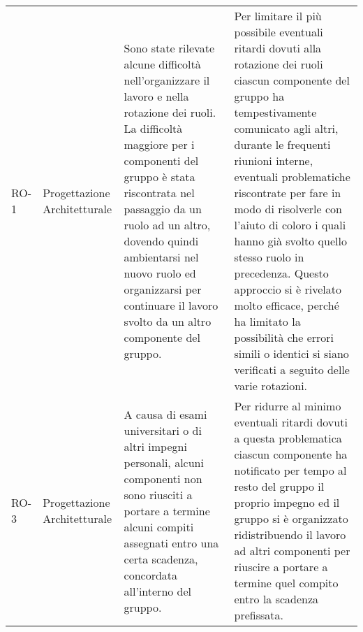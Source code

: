 \begin{longtable}{
		>{\centering}p{}
		>{\centering}p{}
		>{\centering\arraybackslash}p{}
		>{\centering\arraybackslash}p{} }
		RO-1
		&
		Progettazione Architetturale
		&
		Sono state rilevate alcune difficoltà nell'organizzare il lavoro e nella rotazione dei ruoli.
		La difficoltà maggiore per i componenti del gruppo è stata riscontrata nel passaggio da un ruolo ad un altro, dovendo quindi ambientarsi nel nuovo ruolo ed organizzarsi per continuare il lavoro svolto da un altro componente del gruppo.
		&
		Per limitare il più possibile eventuali ritardi dovuti alla rotazione dei ruoli ciascun componente del gruppo ha tempestivamente comunicato agli altri, durante le frequenti riunioni interne, eventuali problematiche riscontrate per fare in modo di risolverle con l'aiuto di coloro i quali hanno già svolto quello stesso ruolo in precedenza.
		Questo approccio si è rivelato molto efficace, perché ha limitato la possibilità che errori simili o identici si siano verificati a seguito delle varie rotazioni. \\

		RO-3
		&
		Progettazione Architetturale
		&
		A causa di esami universitari o di altri impegni personali, alcuni componenti non sono riusciti a portare a termine alcuni compiti assegnati entro una certa scadenza, concordata all'interno del gruppo.
		&
		Per ridurre al minimo eventuali ritardi dovuti a questa problematica ciascun componente ha notificato per tempo al resto del gruppo il proprio impegno ed il gruppo si è organizzato ridistribuendo il lavoro ad altri componenti per riuscire a portare a termine quel compito entro la scadenza prefissata.  \\


\end{longtable}
